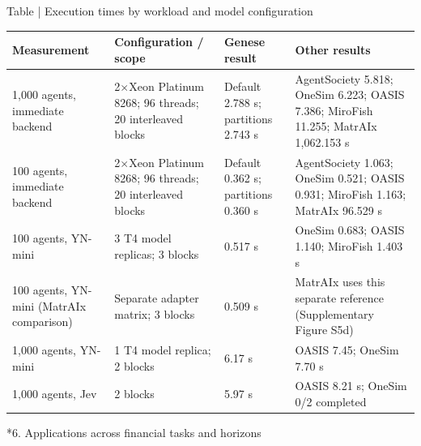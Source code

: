 \documentclass[10pt]{article}
\makeatletter
\renewcommand\section{\@startsection{section}{1}{\z@}{-2.2ex plus -1ex minus -.2ex}{.9ex plus .2ex}{\normalfont\large\mdseries}}
\makeatother
\begin{document}
\begin{table}[!htbp]
\begin{minipage}{\textwidth}
\fontsize{8.5}{10.3}\selectfont
{}\label{table:main6}Table \thetable{} | Execution times by workload and model configuration
\par\vspace{4pt}
\begin{tabularx}{\textwidth}{@{}XXXX@{}}
\toprule
Measurement & Configuration / scope & Genese result & Other results \\
\midrule
1,000 agents, immediate backend & 2\ensuremath{\times}Xeon Platinum 8268; 96 threads; 20 interleaved blocks & Default 2.788 s; partitions 2.743 s & AgentSociety 5.818; OneSim 6.223; OASIS 7.386; MiroFish 11.255; MatrAIx 1,062.153 s \\
100 agents, immediate backend & 2\ensuremath{\times}Xeon Platinum 8268; 96 threads; 20 interleaved blocks & Default 0.362 s; partitions 0.360 s & AgentSociety 1.063; OneSim 0.521; OASIS 0.931; MiroFish 1.163; MatrAIx 96.529 s \\
100 agents, YN-mini & 3 T4 model replicas; 3 blocks & 0.517 s & OneSim 0.683; OASIS 1.140; MiroFish 1.403 s \\
100 agents, YN-mini (MatrAIx comparison) & Separate adapter matrix; 3 blocks & 0.509 s & MatrAIx uses this separate reference (Supplementary Figure S5d) \\
1,000 agents, YN-mini & 1 T4 model replica; 2 blocks & 6.17 s & OASIS 7.45; OneSim 7.70 s \\
1,000 agents, Jev & 2 blocks & 5.97 s & OASIS 8.21 s; OneSim 0/2 completed \\
\bottomrule
\end{tabularx}
\par{}
\end{minipage}
\end{table}
\FloatBarrier

\section*{6. Applications across financial tasks and horizons}
\end{document}
